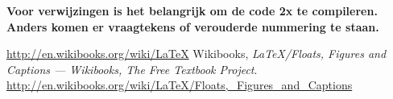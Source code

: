 \textbf{Voor verwijzingen is het belangrijk om de code 2x te compileren. Anders
komen er vraagtekens of verouderde nummering te staan.}

\begin{thebibliography}{99}
		\url{http://en.wikibooks.org/wiki/LaTeX}
	 Wikibooks, \emph{LaTeX/Floats, Figures and Captions
		--- Wikibooks{,} The Free Textbook Project}.
		\url{http://en.wikibooks.org/wiki/LaTeX/Floats,_Figures_and_Captions}
\end{thebibliography}


